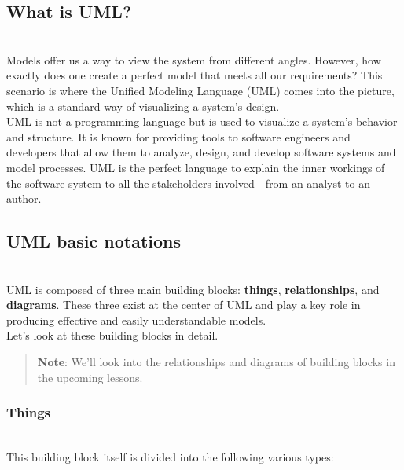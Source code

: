 

\subsection{What is UML?}\label{what-is-uml}
\\
Models offer us a way to view the system from different angles. However, how exactly does one create a perfect model that meets all our requirements? This scenario is where the Unified Modeling Language (UML) comes into the picture, which is a standard way of visualizing a system's design.
\\
UML is not a programming language but is used to visualize a system's behavior and structure. It is known for providing tools to software engineers and developers that allow them to analyze, design, and develop software systems and model processes. UML is the perfect language to explain the inner workings of the software system to all the stakeholders involved---from an analyst to an author.

\subsection{UML basic notations}\label{uml-basic-notations}
\\
UML is composed of three main building blocks: \textbf{things}, \textbf{relationships}, and \textbf{diagrams}. These three exist at the center of UML and play a key role in producing effective and easily understandable models.
\\
Let's look at these building blocks in detail.
\begin{quote}
\textbf{Note}: We'll look into the relationships and diagrams of building blocks in the upcoming lessons.
\end{quote}
\subsubsection{Things}\label{things}
\\
This building block itself is divided into the following various types:

